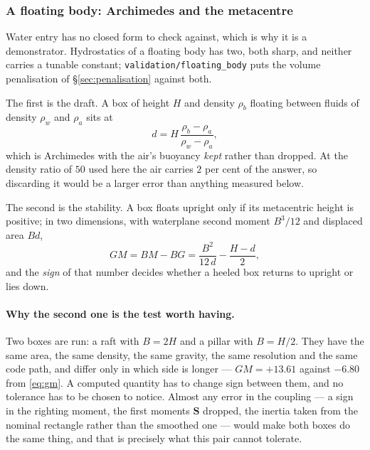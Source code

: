 \documentclass[11pt,a4paper]{article}
\newcommand{\code}[1]{\texttt{\small #1}}
\begin{document}
\subsubsection{A floating body: Archimedes and the metacentre}
\label{sec:floating}

Water entry has no closed form to check against, which is why it is a
demonstrator. Hydrostatics of a floating body has two, both sharp, and neither
carries a tunable constant; \code{validation/floating\_body} puts the volume
penalisation of \S\ref{sec:penalisation} against both.

The first is the draft. A box of height $H$ and density $\rho_b$ floating between
fluids of density $\rho_w$ and $\rho_a$ sits at
\begin{equation}
  d = H\,\frac{\rho_b-\rho_a}{\rho_w-\rho_a},
  \label{eq:draft}
\end{equation}
which is Archimedes with the air's buoyancy \emph{kept} rather than dropped. At
the density ratio of $50$ used here the air carries $2$ per cent of the answer,
so discarding it would be a larger error than anything measured below.

The second is the stability. A box floats upright only if its metacentric height
is positive; in two dimensions, with waterplane second moment $B^3/12$ and
displaced area $Bd$,
\begin{equation}
  GM = BM - BG = \frac{B^2}{12\,d} - \frac{H-d}{2},
  \label{eq:gm}
\end{equation}
and the \emph{sign} of that number decides whether a heeled box returns to
upright or lies down.

\paragraph{Why the second one is the test worth having.} Two boxes are run: a
raft with $B=2H$ and a pillar with $B=H/2$. They have the same area, the same
density, the same gravity, the same resolution and the same code path, and differ
only in which side is longer --- $GM=+13.61$ against $-6.80$ from \eqref{eq:gm}.
A computed quantity has to change sign between them, and no tolerance has to be
chosen to notice. Almost any error in the coupling --- a sign in the righting
moment, the first moments $\bm{S}$ dropped, the inertia taken from the nominal
rectangle rather than the smoothed one --- would make both boxes do the same
thing, and that is precisely what this pair cannot tolerate.
\end{document}
